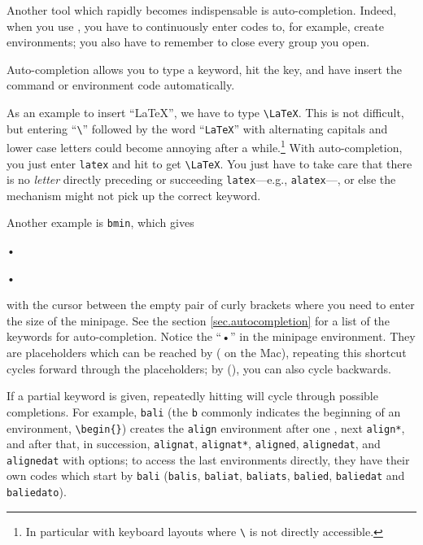Another tool which rapidly becomes indispensable is auto-completion. Indeed, when you use {\AllTeX}, you have to continuously enter codes to, for example, create environments; you also have to remember to close every group you open.

Auto-completion allows you to type a keyword, hit the  key, and have {\Tw} insert the {\AllTeX} command or environment code automatically.

As an example to insert ``\LaTeX'', we have to type \verb|\LaTeX|. This is not difficult, but entering ``\verb|\|'' followed by the word ``\verb|LaTeX|'' with alternating capitals and lower case letters could become annoying after a while.\footnote{In particular with keyboard layouts where \texttt{\textbackslash} is not directly accessible.} With auto-completion, you just enter \verb|latex| and hit  to get \verb|\LaTeX|. You just have to take care that there is no \emph{letter} directly preceding or succeeding \verb|latex|---e.g., \verb|alatex|---, or else the mechanism might not pick up the correct keyword.

Another example is \verb|bmin|, which gives
\begin{verbExample}
\begin{minipage}{}
•
\end{minipage}•
\end{verbExample}
with the cursor between the empty pair of curly brackets where you need to enter the size of the minipage. See the section \ref{sec.autocompletion} for a list of the keywords for auto-completion. Notice the ``•'' in the minipage environment. They are placeholders which can be reached by  ( on the Mac), repeating this shortcut cycles forward through the placeholders; by  (), you can also cycle backwards.

If a partial keyword is given, repeatedly hitting  will cycle through possible completions. For example, \verb|bali| (the \verb|b| commonly indicates the beginning of an environment, \verb|\begin{}|) creates the \verb|align| environment after one , next \verb|align*|, and after that, in succession, \verb|alignat|, \verb|alignat*|, \verb|aligned|, \verb|alignedat|, and \verb|alignedat| with options; to access the last environments directly, they have their own codes which start by \verb|bali| (\verb|balis|, \verb|baliat|, \verb|baliats|, \verb|balied|, \verb|baliedat| and \verb|baliedato|).

